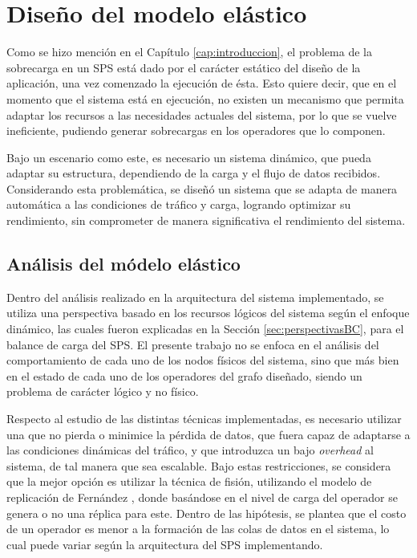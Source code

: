\chapter{Dise\~no del modelo elástico}
\label{cap:disenoSistema}


Como se hizo mención en el Capítulo \ref{cap:introduccion}, el problema de la sobrecarga en un SPS está dado por el carácter estático del diseño de la aplicación, una vez comenzado la ejecución de ésta. Esto quiere decir, que en el momento que el sistema está en ejecución, no existen un mecanismo que permita adaptar los recursos a las necesidades actuales del sistema, por lo que se vuelve ineficiente, pudiendo generar sobrecargas en los operadores que lo componen.

Bajo un escenario como este, es necesario un sistema dinámico, que pueda adaptar su estructura, dependiendo de la carga y el flujo de datos recibidos. Considerando esta problemática, se diseñó un sistema que se adapta de manera automática a las condiciones de tráfico y carga, logrando optimizar su rendimiento, sin comprometer de manera significativa el rendimiento del sistema.

\section{Análisis del módelo elástico}
Dentro del análisis realizado en la arquitectura del sistema implementado, se utiliza una perspectiva basado en los recursos lógicos del sistema según el enfoque dinámico, las cuales fueron explicadas en la Sección \ref{sec:perspectivasBC}, para el balance de carga del SPS. El presente trabajo no se enfoca en el análisis del comportamiento de cada uno de los nodos físicos del sistema, sino que más bien en el estado de cada uno de los operadores del grafo diseñado, siendo un problema de carácter lógico y no físico.

Respecto al estudio de las distintas técnicas implementadas, es necesario utilizar una que no pierda o minimice la pérdida de datos, que fuera capaz de adaptarse a las condiciones dinámicas del tráfico, y que introduzca un bajo \textit{overhead} al sistema, de tal manera que sea escalable. Bajo estas restricciones, se considera que la mejor opción es utilizar la técnica de fisión, utilizando el modelo de replicación de Fernández \citep{FernandezMKP13}, donde basándose en el nivel de carga del operador se genera o no una réplica para este. Dentro de las hipótesis, se plantea que el costo de un operador es menor a la formación de las colas de datos en el sistema, lo cual puede variar según la arquitectura del SPS implementando.

